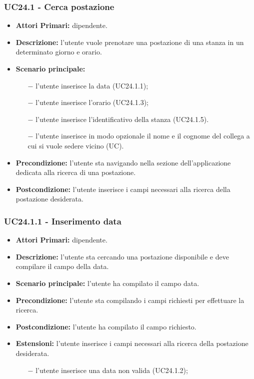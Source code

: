 \subsubsection{ UC24.1 - Cerca postazione}
\begin{itemize}
	\item\textbf{Attori Primari:} dipendente.
	\item\textbf{Descrizione:} l’utente vuole prenotare una postazione di una stanza in un determinato giorno e orario.
	\item\textbf{Scenario principale:} 
	\begin{itemize}
		\item[$-$] l’utente inserisce la data (UC24.1.1);
		\item[$-$] l’utente inserisce l'orario (UC24.1.3);
		\item[$-$] l’utente inserisce l'identificativo della stanza (UC24.1.5).
		\item[$-$] l’utente inserisce in modo opzionale il nome e il cognome del collega a cui si vuole sedere vicino (UC).
	\end{itemize}
	\item\textbf{Precondizione:} l’utente sta navigando nella sezione dell'applicazione dedicata alla ricerca di una postazione.
	\item\textbf{Postcondizione:} l’utente inserisce i campi necessari alla ricerca della postazione desiderata.
\end{itemize}
\subsubsection{ UC24.1.1 - Inserimento data }
\begin{itemize}
	\item\textbf{Attori Primari:} dipendente.
	\item\textbf{Descrizione:} l’utente sta cercando una postazione disponibile e deve compilare il campo della data.
	\item\textbf{Scenario principale:} l’utente ha compilato il campo data.
	\item\textbf{Precondizione:} l’utente sta compilando i campi richiesti per effettuare la ricerca.
	\item\textbf{Postcondizione:} l’utente ha compilato il campo richiesto.
	\item\textbf{Estensioni:} l’utente inserisce i campi necessari alla ricerca della postazione desiderata.
	\begin{itemize}
		\item[$-$] l’utente inserisce una data non valida (UC24.1.2);
	\end{itemize}
\end{itemize}
